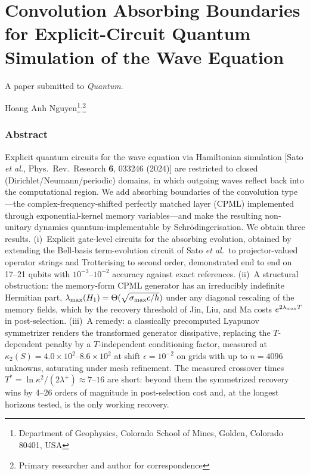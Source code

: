 \chapter{Convolution Absorbing Boundaries for Explicit-Circuit Quantum Simulation of the Wave Equation}\label{chap:qawave}

\begin{center}
    A paper submitted to \emph{Quantum}.

    Hoang Anh Nguyen\footnote{Department of Geophysics, Colorado School of Mines, Golden, Colorado 80401, USA}$^,$\footnote{Primary researcher and author for correspondence}
\end{center}

\subsection{Abstract}

Explicit quantum circuits for the wave equation via Hamiltonian simulation
[Sato \emph{et al.}, Phys.\ Rev.\ Research \textbf{6}, 033246 (2024)] are
restricted to closed (Dirichlet/Neumann/periodic) domains, in which
outgoing waves reflect back into the computational region.  We add
absorbing boundaries of the convolution type---the
complex-frequency-shifted perfectly matched layer (CPML) implemented
through exponential-kernel memory variables---and make the resulting
non-unitary dynamics quantum-implementable by Schr\"odingerisation.  We
obtain three results.  (i)~Explicit gate-level circuits for the absorbing
evolution, obtained by extending the Bell-basis term-evolution circuit of
Sato \emph{et al.}\ to projector-valued operator strings and Trotterising
to second order, demonstrated end to end on 17--21 qubits with
$10^{-3}$--$10^{-2}$ accuracy against exact references.  (ii)~A structural
obstruction: the memory-form CPML generator has an irreducibly indefinite
Hermitian part, $\lambda_{\max}(H_1)=\Theta(\sqrt{\sigma_{\max}c/h})$ under any
diagonal rescaling of the memory fields, which by the recovery threshold
of Jin, Liu, and Ma costs $e^{2\lambda_{\max} T}$ in post-selection.  (iii)~A
remedy: a classically precomputed Lyapunov symmetrizer renders the
transformed generator dissipative, replacing the $T$-dependent penalty by
a $T$-independent conditioning factor, measured at
$\kappa_2(S)=4.0\times10^{2}$--$8.6\times10^{2}$ at shift
$\epsilon=10^{-2}$ on grids with up to $n=4096$ unknowns, saturating under mesh refinement.  The measured
crossover times $T^{*}=\ln\kappa^{2}/(2\lambda^{+})\approx 7$--$16$ are
short: beyond them the symmetrized recovery wins by 4--26 orders of
magnitude in post-selection cost and, at the longest horizons tested, is
the only working recovery.
